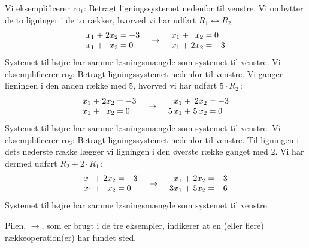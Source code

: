 \begin{example}[Rækkeoperationerne]
Vi eksemplificerer ro$_1$: Betragt ligningssystemet nedenfor til venstre. Vi ombytter de to ligninger i de to rækker, hvorved vi har udført $R_1\leftrightarrow R_2\,$.
\begin{equation}
\eqnl
\begin{array}{rcrcl}
x_1 &+& 2x_2 &=& -3\\
x_1 &+& x_2 &=& 0
\end{array}
\quad \rightarrow \quad
\begin{array}{rcrcl}
x_1 &+& x_2 &=& 0\\
x_1 &+& 2x_2 &=& -3
\end{array}
\end{equation}
Systemet til højre har samme løsningsmængde som systemet til venstre.\bs
Vi eksemplificerer ro$_2$: Betragt ligningssystemet nedenfor til venstre. Vi ganger ligningen i den anden række med $5$, hvorved vi har udført $5\cdot R_2\,$:
\begin{equation}
\eqnl
\begin{array}{rcrcl}
x_1 &+& 2x_2 &=& -3\\
x_1 &+& x_2 &=& 0
\end{array}
\quad \rightarrow \quad
\begin{array}{rcrcl}
x_1 &+& 2x_2 &=& -3\\
5\,x_1 &+& 5\,x_2 &=& 0
\end{array}
\end{equation}
Systemet til højre har samme løsningsmængde som systemet til venstre.\bs
Vi eksemplificerer ro$_3$: Betragt ligningssystemet nedenfor til venstre. Til ligningen i dets nederste række lægger vi ligningen i den øverste række ganget med $2$. Vi har dermed udført $R_2+2\cdot R_1\,$:
\begin{equation}
\eqnl
\begin{array}{rcrcl}
x_1 &+& 2x_2 &=& -3\\
x_1 &+& x_2 &=& 0
\end{array}
\quad \rightarrow \quad
\begin{array}{rcrcl}
x_1 &+& 2x_2 &=& -3\\
3x_1 &+& 5x_2 &=& -6
\end{array}
\end{equation}
Systemet til højre har samme løsningsmængde som systemet til venstre.

\begin{aha}
Pilen, $ \rightarrow $, som er brugt i de tre eksempler, indikerer at en (eller flere) rækkeoperation(er) har fundet sted.
\end{aha}
\end{example}

